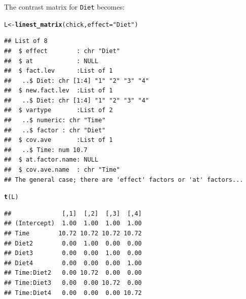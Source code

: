 \documentclass[10pt]{article}\usepackage[]{graphicx}\usepackage[]{color}
\makeatletter
\newcommand{\hlstr}[1]{\textcolor[rgb]{0.192,0.494,0.8}{#1}}%
\newcommand{\hlstd}[1]{\textcolor[rgb]{0.345,0.345,0.345}{#1}}%
\newcommand{\hlkwb}[1]{\textcolor[rgb]{0.69,0.353,0.396}{#1}}%
\newcommand{\hlkwc}[1]{\textcolor[rgb]{0.333,0.667,0.333}{#1}}%
\newcommand{\hlkwd}[1]{\textcolor[rgb]{0.737,0.353,0.396}{\textbf{#1}}}%
\newenvironment{kframe}{%
 \def\at@end@of@kframe{}%
 \ifinner\ifhmode%
  \def\at@end@of@kframe{\end{minipage}}%
  \begin{minipage}{\columnwidth}%
 \fi\fi%
 \def\FrameCommand##1{\hskip\@totalleftmargin \hskip-\fboxsep
 \colorbox{shadecolor}{##1}\hskip-\fboxsep
     \hskip-\linewidth \hskip-\@totalleftmargin \hskip\columnwidth}%
 \MakeFramed {\advance\hsize-\width
   \@totalleftmargin\z@ \linewidth\hsize
   \@setminipage}}%
 {\par\unskip\endMakeFramed%
 \at@end@of@kframe}
\newenvironment{knitrout}{}{} %
\def\cc#1{\texttt{#1}}
\makeatother
\begin{document}
The contrast matrix for \cc{Diet} becomes:
\begin{knitrout}
\color{fgcolor}\begin{kframe}
\begin{alltt}
\hlstd{L} \hlkwb{<-} \hlkwd{linest_matrix}\hlstd{(chick,} \hlkwc{effect}\hlstd{=}\hlstr{"Diet"}\hlstd{)}
\end{alltt}
\begin{verbatim}
## List of 8
##  $ effect        : chr "Diet"
##  $ at            : NULL
##  $ fact.lev      :List of 1
##   ..$ Diet: chr [1:4] "1" "2" "3" "4"
##  $ new.fact.lev  :List of 1
##   ..$ Diet: chr [1:4] "1" "2" "3" "4"
##  $ vartype       :List of 2
##   ..$ numeric: chr "Time"
##   ..$ factor : chr "Diet"
##  $ cov.ave       :List of 1
##   ..$ Time: num 10.7
##  $ at.factor.name: NULL
##  $ cov.ave.name  : chr "Time"
## The general case; there are 'effect' factors or 'at' factors...
\end{verbatim}
\begin{alltt}
\hlkwd{t}\hlstd{(L)}
\end{alltt}
\begin{verbatim}
##              [,1]  [,2]  [,3]  [,4]
## (Intercept)  1.00  1.00  1.00  1.00
## Time        10.72 10.72 10.72 10.72
## Diet2        0.00  1.00  0.00  0.00
## Diet3        0.00  0.00  1.00  0.00
## Diet4        0.00  0.00  0.00  1.00
## Time:Diet2   0.00 10.72  0.00  0.00
## Time:Diet3   0.00  0.00 10.72  0.00
## Time:Diet4   0.00  0.00  0.00 10.72
\end{verbatim}
\end{kframe}
\end{knitrout}
\end{document}
